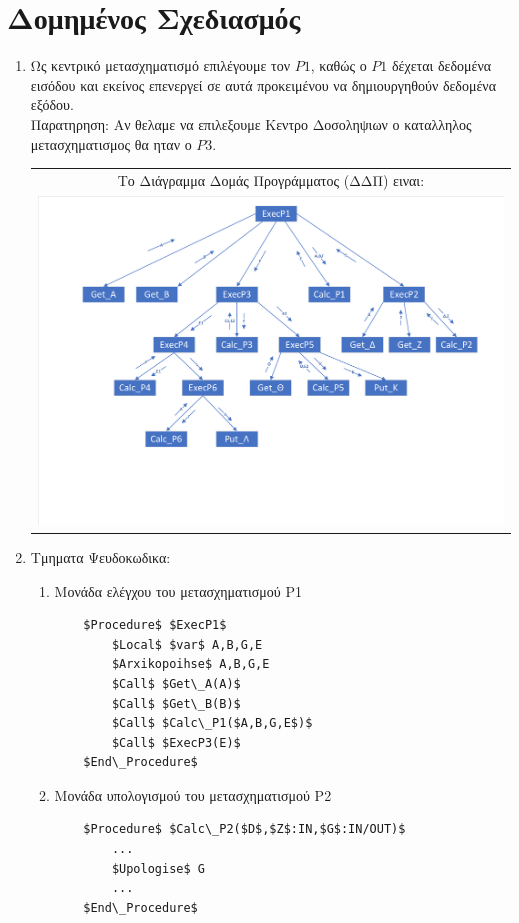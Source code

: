 \documentclass[12pt]{article}
\newcommand\tab[1][1cm]{\hspace*{#1}}
\begin{document}
\section{Δομημένος Σχεδιασμός}
\begin{enumerate}

\item
\tab Ως κεντρικό μετασχηματισμό επιλέγουμε τον $P1$, καθώς ο $P1$ 
δέχεται δεδομένα εισόδου και εκείνος επενεργεί σε αυτά προκειμένου να δημιουργηθούν δεδομένα εξόδου.\\
\tab Παρατηρηση: Αν θελαμε να επιλεξουμε Κεντρο Δοσοληψιων ο καταλληλος μετασχηματισμος θα ηταν ο $P3$.

\begin{center}
\begin{tabular}{c}
Το Διάγραμμα Δομάς Προγράμματος (ΔΔΠ) ειναι:\\
\includegraphics[scale=0.5]{MerosG/DDP}
\end{tabular}
\end{center}

\newpage
\item Τμηματα Ψευδοκωδικα:
\begin{enumerate}[label*=\roman*]
	\item Mονάδα ελέγχου του μετασχηματισμού Ρ1
	
	\begin{lstlisting}
	$Procedure$ $ExecP1$
		$Local$ $var$ A,B,G,E
		$Arxikopoihse$ A,B,G,E
		$Call$ $Get\_A(A)$
		$Call$ $Get\_B(B)$
		$Call$ $Calc\_P1($A,B,G,E$)$
		$Call$ $ExecP3(E)$
	$End\_Procedure$
	\end{lstlisting}
	
	\item  Μονάδα υπολογισμού του μετασχηματισμού Ρ2
	\begin{lstlisting}
	$Procedure$ $Calc\_P2($D$,$Z$:IN,$G$:IN/OUT)$
		...
		$Upologise$ G
		...
	$End\_Procedure$
	\end{lstlisting}
	

\end{enumerate}
\end{enumerate}
\end{document}
